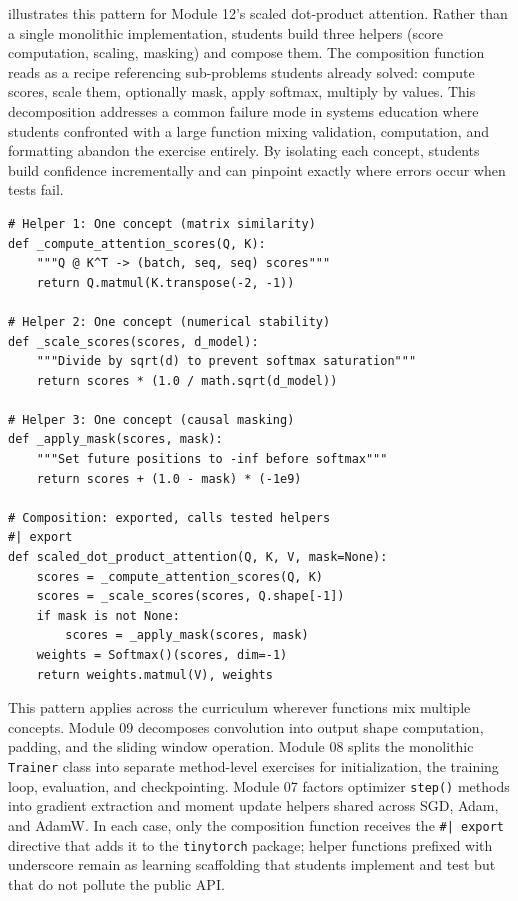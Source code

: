 \documentclass[10pt,twocolumn]{article}
\begin{document}
 illustrates this pattern for Module 12's scaled dot-product attention. Rather than a single monolithic implementation, students build three helpers (score computation, scaling, masking) and compose them. The composition function reads as a recipe referencing sub-problems students already solved: compute scores, scale them, optionally mask, apply softmax, multiply by values. This decomposition addresses a common failure mode in systems education where students confronted with a large function mixing validation, computation, and formatting abandon the exercise entirely. By isolating each concept, students build confidence incrementally and can pinpoint exactly where errors occur when tests fail.

\begin{lstlisting}[caption={\textbf{Intra-Module Decomposition.} Scaled dot-product attention is decomposed into three focused helpers, each teaching one concept, with a composition function that calls them. Only the composition function is exported to the package; helpers are learning scaffolding.},label={lst:attention-decomp},float=t]
# Helper 1: One concept (matrix similarity)
def _compute_attention_scores(Q, K):
    """Q @ K^T -> (batch, seq, seq) scores"""
    return Q.matmul(K.transpose(-2, -1))

# Helper 2: One concept (numerical stability)
def _scale_scores(scores, d_model):
    """Divide by sqrt(d) to prevent softmax saturation"""
    return scores * (1.0 / math.sqrt(d_model))

# Helper 3: One concept (causal masking)
def _apply_mask(scores, mask):
    """Set future positions to -inf before softmax"""
    return scores + (1.0 - mask) * (-1e9)

# Composition: exported, calls tested helpers
#| export
def scaled_dot_product_attention(Q, K, V, mask=None):
    scores = _compute_attention_scores(Q, K)
    scores = _scale_scores(scores, Q.shape[-1])
    if mask is not None:
        scores = _apply_mask(scores, mask)
    weights = Softmax()(scores, dim=-1)
    return weights.matmul(V), weights
\end{lstlisting}

This pattern applies across the curriculum wherever functions mix multiple concepts. Module 09 decomposes convolution into output shape computation, padding, and the sliding window operation. Module 08 splits the monolithic \texttt{Trainer} class into separate method-level exercises for initialization, the training loop, evaluation, and checkpointing. Module 07 factors optimizer \texttt{step()} methods into gradient extraction and moment update helpers shared across SGD, Adam, and AdamW. In each case, only the composition function receives the \texttt{\#| export} directive that adds it to the \texttt{tinytorch} package; helper functions prefixed with underscore remain as learning scaffolding that students implement and test but that do not pollute the public API.
\end{document}
